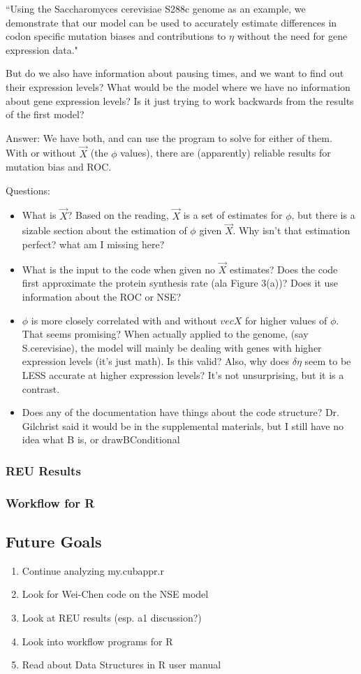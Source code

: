 \documentclass[11pt]{article} %
\begin{document}
``Using the Saccharomyces cerevisiae S288c genome as an example, we demonstrate that our model can be used to accurately estimate differences in codon specific mutation biases and contributions to $\eta$ without the need for gene expression data."


But do we also have information about pausing times, and we want to find out their expression levels?
What would be the model where we have no information about gene expression levels? Is it just trying to work backwards from the results of the first model?

Answer: We have both, and can use the program to solve for either of them. With or without $\vec{X}$ (the $\phi$ values), there are (apparently) reliable results for  mutation bias and ROC. 

Questions:
\begin{itemize}
\item What is $\vec{X}$? Based on the reading, $\vec{X}$ is a set of estimates for $\phi$, but there is a sizable section about the estimation of $\phi$ given $\vec{X}$. Why isn't that estimation perfect? what am I missing here?
\item What is the input to the code when given no $\vec{X}$ estimates? Does the code first approximate the protein synthesis rate (ala Figure 3(a))? Does it use information about the ROC or NSE?
\item $\phi$ is more closely correlated with and without $vec{X}$ for higher values of $\phi$. That seems promising? When actually applied to the genome, (say S.cerevisiae), the model will mainly be dealing with genes with higher expression levels (it's just math). Is this valid? Also, why does $\delta\eta$ seem to be LESS accurate at higher expression levels? It's not unsurprising, but it is a contrast.
\item Does any of the documentation have things about the code structure? Dr. Gilchrist said it would be in the supplemental materials, but I still have no idea what B is, or drawBConditional
\end{itemize}





\subsubsection{REU Results}

\subsubsection{Workflow for R}


\subsection{Future Goals}
\begin{enumerate}
\item Continue analyzing my.cubappr.r
\item Look for Wei-Chen code on the NSE model
\item Look at REU results (esp. a1 discussion?)
\item Look into workflow programs for R
\item Read about Data Structures in R user manual
\end{enumerate}
\end{document}
